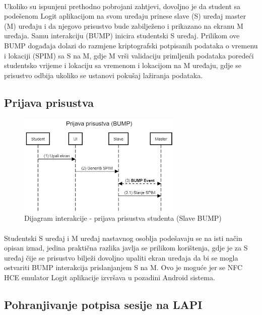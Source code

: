 \paragraph*{}
Ukoliko su ispunjeni prethodno pobrojani zahtjevi, dovoljno je da student sa podešenom Logit aplikacijom na svom uređaju prinese slave (S) uređaj master (M) uređaju i da njegovo prisustvo bude zabilježeno i prikazano na ekranu M uređaja. Samu interakciju (BUMP) inicira studentski S uređaj. Prilikom ove BUMP događaja dolazi do razmjene kriptografski potpisanih podataka o vremenu i lokaciji (SPIM) sa S na M, gdje M vrši validaciju primljenih podataka poredeći studentsko vrijeme i lokaciju sa vremenom i lokacijom na M uređaju, gdje se prisustvo odbija ukoliko se ustanovi pokušaj lažiranja podataka.

\subsection*{Prijava prisustva}
\begin{figure}[H]
    \centering
    \includegraphics[width=0.7\textwidth]{material/dia/03_prijava}
    \caption{Dijagram interakcije - prijava prisustva studenta (Slave BUMP)}
\end{figure}
\paragraph*{}
Studentski S uređaj i M uređaj nastavnog osoblja podešavaju se na isti način opisan iznad, jedina praktična razlika javlja se prilikom korištenja, gdje je za S uređaj čije se prisustvo bilježi dovoljno upaliti ekran uređaja da bi se mogla ostvariti BUMP interakcija prislanjanjem S na M. Ovo je moguće jer se NFC HCE emulator Logit aplikacije izvršava u pozadini Android sistema.

\subsection*{Pohranjivanje potpisa sesije na LAPI}
